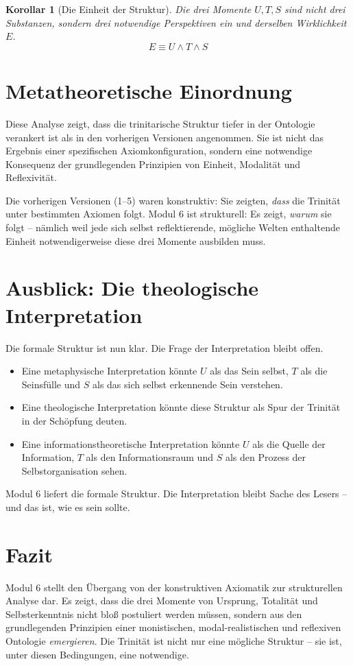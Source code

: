 \documentclass[12pt,a4paper]{article}
\newtheorem{corollary}[theorem]{Korollar}
\begin{document}
\begin{corollary}[Die Einheit der Struktur]
\label{cor:unity}
Die drei Momente \(U, T, S\) sind nicht drei Substanzen, sondern drei notwendige Perspektiven ein und derselben Wirklichkeit \(E\).
\begin{equation}
E \equiv U \land T \land S
\end{equation}
\end{corollary}

\section{Metatheoretische Einordnung}

Diese Analyse zeigt, dass die trinitarische Struktur tiefer in der Ontologie verankert ist als in den vorherigen Versionen angenommen. Sie ist nicht das Ergebnis einer spezifischen Axiomkonfiguration, sondern eine notwendige Konsequenz der grundlegenden Prinzipien von Einheit, Modalität und Reflexivität.

Die vorherigen Versionen (1–5) waren konstruktiv: Sie zeigten, \emph{dass} die Trinität unter bestimmten Axiomen folgt. Modul 6 ist strukturell: Es zeigt, \emph{warum} sie folgt – nämlich weil jede sich selbst reflektierende, mögliche Welten enthaltende Einheit notwendigerweise diese drei Momente ausbilden muss.

\section{Ausblick: Die theologische Interpretation}

Die formale Struktur ist nun klar. Die Frage der Interpretation bleibt offen.

\begin{itemize}
\item Eine metaphysische Interpretation könnte \(U\) als das Sein selbst, \(T\) als die Seinsfülle und \(S\) als das sich selbst erkennende Sein verstehen.
\item Eine theologische Interpretation könnte diese Struktur als Spur der Trinität in der Schöpfung deuten.
\item Eine informationstheoretische Interpretation könnte \(U\) als die Quelle der Information, \(T\) als den Informationsraum und \(S\) als den Prozess der Selbstorganisation sehen.
\end{itemize}

Modul 6 liefert die formale Struktur. Die Interpretation bleibt Sache des Lesers – und das ist, wie es sein sollte.

\section{Fazit}

Modul 6 stellt den Übergang von der konstruktiven Axiomatik zur strukturellen Analyse dar. Es zeigt, dass die drei Momente von Ursprung, Totalität und Selbsterkenntnis nicht bloß postuliert werden müssen, sondern aus den grundlegenden Prinzipien einer monistischen, modal-realistischen und reflexiven Ontologie \emph{emergieren}. Die Trinität ist nicht nur eine mögliche Struktur – sie ist, unter diesen Bedingungen, eine notwendige.
\end{document}
